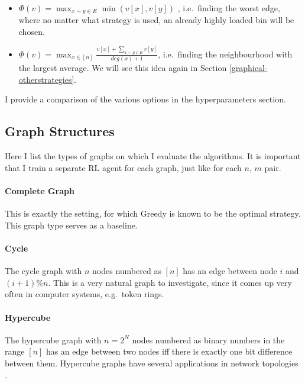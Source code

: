 \begin{itemize}
    \item 
    $\Phi(v)=\max_{x\sim y \in E} \min(v[x], v[y])$ , i.e.\ finding the worst edge, where no matter what strategy is used, an already highly loaded bin will be chosen.
    \item
    $\Phi(v)=\max_{x \in [n]} \frac{v[x]+\sum_{x\sim y \in E}v[y]}{deg(x)+1}$, i.e.\ finding the neighbourhood with the largest average. We will see this idea again in Section \ref{graphical-otherstrategies}.
\end{itemize}

I provide a comparison of the various options in the hyperparameters section.


\subsection{Graph Structures}


Here I list the types of graphs on which I evaluate the algorithms. It is important that I train a separate RL agent for each graph, just like for each $n$, $m$ pair.


\paragraph{Complete Graph} This is exactly the \TwoChoice setting, for which Greedy is known to be the optimal strategy. This graph type serves as a baseline.


\paragraph{Cycle} The cycle graph with $n$ nodes numbered as $[n]$ has an edge between node $i$ and $(i+1)\%n$. This is a very natural graph to investigate, since it comes up very often in computer systems, e.g.\ token rings.


\paragraph{Hypercube} The hypercube graph with $n=2^N$ nodes numbered as binary numbers in the range $[n]$ has an edge between two nodes iff there is exactly one bit difference between them. Hypercube graphs have several applications in network topologies \cite{ostrouchov1987hypercubenetwork} .


